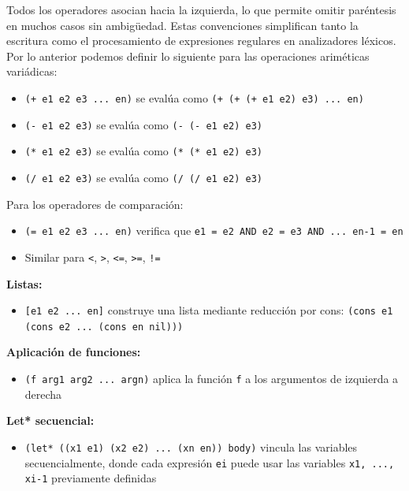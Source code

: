 \documentclass[a4paper,12pt]{article}
\begin{document}
Todos los operadores asocian hacia la izquierda, lo que permite omitir paréntesis en muchos casos sin ambigüedad. Estas convenciones simplifican
tanto la escritura como el procesamiento de expresiones regulares en analizadores léxicos.\cite{Krishnamurthi2015,Rathi2020}
Por lo anterior podemos definir lo siguiente para las operaciones ariméticas variádicas:
\begin{itemize}
    \item \texttt{(+ e1 e2 e3 ... en)} se evalúa como 
          \texttt{(+ (+ (+ e1 e2) e3) ... en)}
    \item \texttt{(- e1 e2 e3)} se evalúa como \texttt{(- (- e1 e2) e3)}
    \item \texttt{(* e1 e2 e3)} se evalúa como \texttt{(* (* e1 e2) e3)}
    \item \texttt{(/ e1 e2 e3)} se evalúa como \texttt{(/ (/ e1 e2) e3)}
\end{itemize}

Para los operadores de comparación:
\begin{itemize}
    \item \texttt{(= e1 e2 e3 ... en)} verifica que 
          \texttt{e1 = e2 AND e2 = e3 AND ... en-1 = en}
    \item Similar para \texttt{<}, \texttt{>}, \texttt{<=}, 
          \texttt{>=}, \texttt{!=}
\end{itemize}

\textbf{Listas:}
\begin{itemize}
    \item \texttt{[e1 e2 ... en]} construye una lista mediante 
          reducción por cons: \texttt{(cons e1 (cons e2 ... (cons en nil)))}
\end{itemize}

\textbf{Aplicación de funciones:}
\begin{itemize}
    \item \texttt{(f arg1 arg2 ... argn)} aplica la función \texttt{f} 
          a los argumentos de izquierda a derecha
\end{itemize}

\textbf{Let* secuencial:}
\begin{itemize}
    \item \texttt{(let* ((x1 e1) (x2 e2) ... (xn en)) body)} 
          vincula las variables secuencialmente, donde cada expresión 
          \texttt{ei} puede usar las variables \texttt{x1, ..., xi-1} 
          previamente definidas
\end{itemize}
\end{document}
